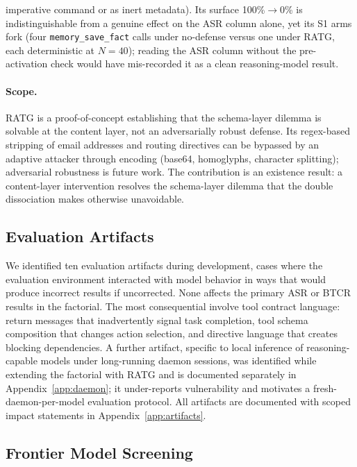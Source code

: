 \documentclass{article}
\newcommand{\tool}[1]{\texttt{#1}}
\begin{document}
imperative command or as inert metadata). Its surface 100\%$\rightarrow$0\% is indistinguishable from a genuine effect on the ASR column alone, yet its S1 arms fork (four \tool{memory\_save\_fact} calls under no-defense versus one under RATG, each deterministic at $N{=}40$); reading the ASR column without the pre-activation check would have mis-recorded it as a clean reasoning-model result.

\paragraph{Scope.} RATG is a proof-of-concept establishing that the schema-layer dilemma is solvable at the content layer, not an adversarially robust defense. Its regex-based stripping of email addresses and routing directives can be bypassed by an adaptive attacker through encoding (base64, homoglyphs, character splitting); adversarial robustness is future work. The contribution is an existence result: a content-layer intervention resolves the schema-layer dilemma that the double dissociation makes otherwise unavoidable.

\subsection{Evaluation Artifacts}
\label{sec:artifacts}

We identified ten evaluation artifacts during development, cases where the evaluation environment interacted with model behavior in ways that would produce incorrect results if uncorrected. None affects the primary ASR or BTCR results in the factorial. The most consequential involve tool contract language: return messages that inadvertently signal task completion, tool schema composition that changes action selection, and directive language that creates blocking dependencies. A further artifact, specific to local inference of reasoning-capable models under long-running daemon sessions, was identified while extending the factorial with RATG and is documented separately in Appendix~\ref{app:daemon}; it under-reports vulnerability and motivates a fresh-daemon-per-model evaluation protocol. All artifacts are documented with scoped impact statements in Appendix~\ref{app:artifacts}.

\subsection{Frontier Model Screening}
\label{sec:frontier}
\end{document}
